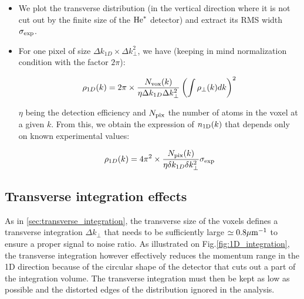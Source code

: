 \begin{itemize}
    \item We plot the transverse distribution (in the vertical direction where it is not cut out by the finite size of the $\mathrm{He}^*$ detector) and extract its RMS width $\sigma_{\rm{exp}}$.
    \item For one pixel of size $\Delta k_{1D} \times \Delta k_{\perp}^2$, we have (keeping in mind normalization condition with the factor $2\pi$):
    

    \begin{align}
        \rho_{1D}(k) &= 2\pi \times \frac{N_{\rm{vox}}(k)}{\eta \Delta k_{1D} \Delta k_{\perp}^2} \left(\int \rho_{\perp}(k) dk \right)^2 \\
    \end{align}
    
    \noindent $\eta$ being the detection efficiency and $N_{\rm{pix}}$ the number of atoms in the voxel at a given $k$. From this, we obtain the expression of $n_{\rm{1D}}(k)$ that depends only on known experimental values:
    
    \begin{equation}
        \rho_{1D}(k) = 4\pi^2 \times \frac{N_{\rm{pix}}(k)}{\eta \delta k_{1D} \delta k_{\perp}^2} \sigma_{\rm{exp}} 
    \end{equation}

    

\end{itemize}

\subsection{Transverse integration effects}

As in \ref{sec:transverse_integration}, the transverse size of the voxels defines a transverse integration $\Delta k_{\perp}$ that needs to be sufficiently large $\simeq 0.8 \mu \rm{m^{-1}}$ to ensure a proper signal to noise ratio. As illustrated on Fig.\ref{fig:1D_integration}, the transverse integration however effectively reduces the momentum range in the 1D direction because of the circular shape of the detector that cuts out a part of the integration volume. The transverse integration must then be kept as low as possible and the distorted edges of the distribution ignored in the analysis. 


